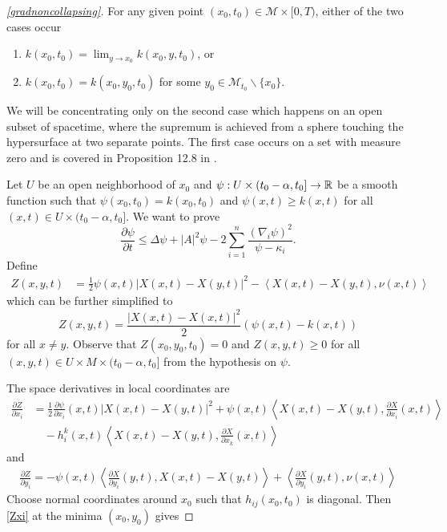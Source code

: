 \begin{proof}[\cref{gradnoncollapsing}]
    For any given point $ (x_{0},t_{0}) \in \mathcal{M} \times [0,T) $, either of the two cases occur
    \begin{enumerate}
        \item $ k(x_{0},t_{0}) = \lim_{y \to x_{0}} k(x_{0},y,t_{0}) $, or 
        \item $ k(x_{0},t_{0}) = k(x_{0}, y_{0},t_{0}) $ for some $ y_{0} \in \mathcal{M}_{t_{0}} \backslash \{x_{0}\} $.
    \end{enumerate}

    We will be concentrating only on the second case which happens on an open subset of spacetime, where the supremum is achieved from a sphere touching the hypersurface at two separate points. The first case occurs on a set with measure zero and is covered in Proposition 12.8 in \cite{andrews2022extrinsic}.
    
    Let $ U $ be an open neighborhood of $ x_{0} $ and $ \psi : U \times (t_{0}-\alpha,t_{0}] \to \mathbb{R} $ be a smooth function such that $ \psi(x_{0},t_{0}) = k(x_{0},t_{0}) $ and $ \psi(x,t) \ge k(x,t) $ for all $ (x,t) \in U \times (t_{0}-\alpha,t_{0}] $. We want to prove\begin{equation}
        \frac{\partial \psi}{\partial t} \le \Delta \psi + |A|^{2}\psi - 2 \sum_{i=1}^{n} \frac{ (\nabla_{i}\psi)^{2}}{\psi-\kappa_{i}}. \label{psi}
    \end{equation}
    Define \begin{align}
        Z(x,y,t) & = \frac{1}{2}\psi(x,t)|X(x,t)-X(y,t)|^{2} - \left< X(x,t) - X(y,t), \nu(x,t) \right>
    \end{align}
    which can be further simplified to \begin{equation*}
        Z(x,y,t) = \frac{|X(x,t)-X(x,t)|^{2}}{2}(\psi(x,t) - k(x,t)) %
    \end{equation*}
    for all $ x \neq y $. Observe that $ Z(x_{0},y_{0},t_{0}) = 0 $  and $ Z(x,y,t) \ge 0 $ for all $ (x,y,t) \in U \times M \times (t_{0}-\alpha,t_{0}] $ from the hypothesis on $ \psi $. 

    The space derivatives in local coordinates are 
    \begin{align}
        \frac{\partial Z}{ \partial x_{i}}  & =  \frac{1}{2} \frac{\partial \psi}{\partial x_{i}}(x,t)|X(x,t) - X(y,t)|^{2} + \psi(x,t)\left< X(x,t)-X(y,t), \frac{\partial X}{\partial x_{i}}(x,t) \right> \nonumber \\
        & \quad - h_{i}^{k}(x,t)\left< X(x,t)-X(y,t), \frac{\partial X}{\partial x_{k}}(x,t) \right> \label{Zxi}
    \end{align}
    and \begin{align}
        \frac{\partial Z}{\partial y_{i}} = - \psi(x,t)\left< \frac{\partial X}{\partial y_{i}}(y,t), X(x,t) - X(y,t) \right> + \left< \frac{\partial X}{\partial y_{i}}(y,t) , \nu(x,t)\right> \label{Zyi}
    \end{align}
    Choose normal coordinates around $ x_{0} $ such that $ h_{ij}(x_{0},t_{0}) $ is diagonal. Then \cref{Zxi} at the minima $ (x_{0},y_{0}) $ gives
    

\end{proof}
